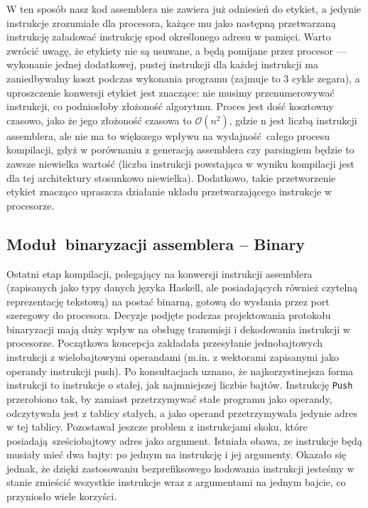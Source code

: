W ten sposób nasz kod assemblera nie zawiera już odniesień do etykiet, a jedynie instrukcje zrozumiałe dla procesora, każące mu jako następną przetwarzaną instrukcję załadować instrukcję spod określonego adresu w pamięci. Warto zwrócić uwagę, że etykiety nie są usuwane, a będą pomijane przez procesor --- wykonanie jednej dodatkowej, pustej instrukcji dla każdej instrukcji ma zaniedbywalny koszt podczas wykonania programu (zajmuje to 3 cykle zegara), a uproszczenie konwersji etykiet jest znaczące: nie musimy przenumerowywać instrukcji, co podniosłoby złożoność algorytmu. Proces jest dość kosztowny czasowo, jako że jego złożoność czasowa to $\mathcal{O}(n^2)$, gdzie n jest liczbą instrukcji assemblera, ale nie ma to większego wpływu na wydajność całego procesu kompilacji, gdyż w porównaniu z generacją assemblera czy parsingiem będzie to zawsze niewielka wartość (liczba instrukcji powstająca w wyniku kompilacji jest dla tej architektury stosunkowo niewielka). Dodatkowo, takie przetworzenie etykiet znacząco upraszcza działanie układu przetwarzającego instrukcje w procesorze.


\subsection{Moduł binaryzacji assemblera -- Binary}

Ostatni etap kompilacji, polegający na konwersji instrukcji assemblera (zapisanych jako typy danych języka Haskell, ale posiadających również czytelną reprezentację tekstową) na postać binarną, gotową do wysłania przez port szeregowy do procesora. Decyzje podjęte podczas projektowania protokołu binaryzacji mają duży wpływ na obsługę transmisji i dekodowania instrukcji w procesorze. Początkowa koncepcja zakładała przesyłanie jednobajtowych instrukcji z wielobajtowymi operandami (m.in. z wektorami zapisanymi jako operandy instrukcji push). Po konsultacjach uznano, że najkorzystinejsza forma instrukcji to instrukcje o stałej, jak najmniejszej liczbie bajtów. Instrukcję \texttt{Push} przerobiono tak, by zamiast przetrzymywać stałe programu jako operandy, odczytywała jest z tablicy stałych, a jako operand przetrzymywała jedynie adres w tej tablicy. Pozostawał jeszcze problem z instrukcjami skoku, które posiadają sześciobajtowy adres jako argument. Istniała obawa, ze instrukcje będą musiały mieć dwa bajty: po jednym na instrukcję i jej argumenty. Okazało się jednak, że dzięki zastosowaniu bezprefiksowego kodowania instrukcji jesteśmy w stanie zmieścić wszystkie instrukcje wraz z argumentami na jednym bajcie, co przyniosło wiele korzyści.

